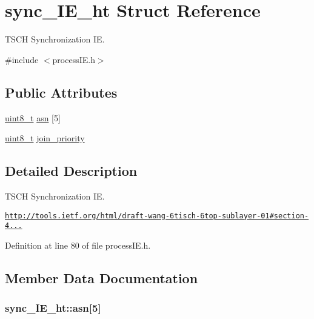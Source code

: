 \hypertarget{structsync___i_e__ht}{}\section{sync\+\_\+\+I\+E\+\_\+ht Struct Reference}
\label{structsync___i_e__ht}


T\+S\+CH Synchronization IE.  




{\ttfamily \#include $<$process\+I\+E.\+h$>$}

\subsection*{Public Attributes}
\begin{DoxyCompactItemize}
\item 
\hyperlink{_p_e___types_8h_aba7bc1797add20fe3efdf37ced1182c5}{uint8\+\_\+t} \hyperlink{structsync___i_e__ht_a8ca99f3d445a9c32baf7eef6fee13d6e}{asn} \mbox{[}5\mbox{]}
\item 
\hyperlink{_p_e___types_8h_aba7bc1797add20fe3efdf37ced1182c5}{uint8\+\_\+t} \hyperlink{structsync___i_e__ht_a8100943bf54a2fe8f359d6a5bfe20dc3}{join\+\_\+priority}
\end{DoxyCompactItemize}


\subsection{Detailed Description}
T\+S\+CH Synchronization IE. 

\href{http://tools.ietf.org/html/draft-wang-6tisch-6top-sublayer-01#section-4.1.1.1}{\tt http\+://tools.\+ietf.\+org/html/draft-\/wang-\/6tisch-\/6top-\/sublayer-\/01\#section-\/4...} 

Definition at line 80 of file process\+I\+E.\+h.



\subsection{Member Data Documentation}
\subsubsection[{\texorpdfstring{asn}{asn}}]{ sync\+\_\+\+I\+E\+\_\+ht\+::asn\mbox{[}5\mbox{]}}\hypertarget{structsync___i_e__ht_a8ca99f3d445a9c32baf7eef6fee13d6e}{}\label{structsync___i_e__ht_a8ca99f3d445a9c32baf7eef6fee13d6e}


